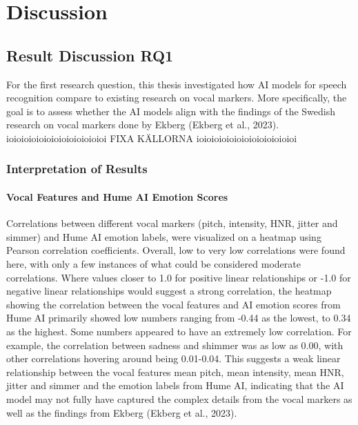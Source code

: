 \chapter{Discussion}
\label{sec:discussion}

\section{Result Discussion RQ1}
For the first research question, this thesis investigated how AI models for speech recognition compare to existing research on vocal markers. More specifically, the goal is to assess whether the AI models align with the findings of the Swedish research on vocal markers done by Ekberg (Ekberg et al., 2023).
ioioioioioioioioioioioioioi FIXA KÄLLORNA ioioioioioioioioioioioioioi
\subsection{Interpretation of Results}
\subsubsection{Vocal Features and Hume AI Emotion Scores}
Correlations between different vocal markers (pitch, intensity, HNR, jitter and simmer) and Hume AI emotion labels, were visualized on a heatmap using Pearson correlation coefficients. Overall, low to very low correlations were found here, with only a few instances of what could be considered moderate correlations.  
Where values closer to 1.0 for positive linear relationships or -1.0 for negative linear relationships would suggest a strong correlation, the heatmap showing the correlation between the vocal features and AI emotion scores from Hume AI primarily showed low numbers ranging from -0.44 as the lowest, to 0.34 as the highest. Some numbers appeared to have an extremely low correlation. For example, the correlation between sadness and shimmer was as low as 0.00, with other correlations hovering around being 0.01-0.04.
This suggests a weak linear relationship between the vocal features mean pitch, mean intensity, mean HNR, jitter and simmer and the emotion labels from Hume AI, indicating that the AI model may not fully have captured the complex details from the vocal markers as well as the findings from Ekberg (Ekberg et al., 2023).

